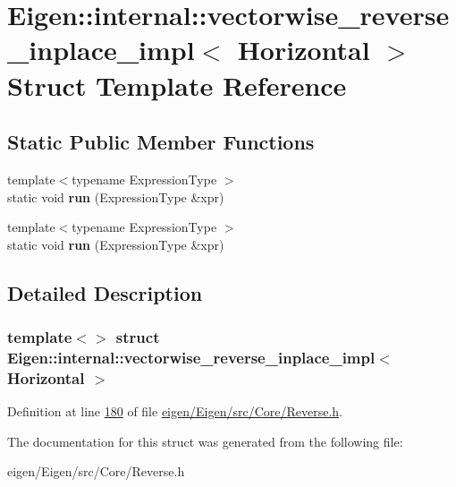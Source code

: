 \hypertarget{struct_eigen_1_1internal_1_1vectorwise__reverse__inplace__impl_3_01_horizontal_01_4}{}\section{Eigen\+:\+:internal\+:\+:vectorwise\+\_\+reverse\+\_\+inplace\+\_\+impl$<$ Horizontal $>$ Struct Template Reference}
\label{struct_eigen_1_1internal_1_1vectorwise__reverse__inplace__impl_3_01_horizontal_01_4}
\subsection*{Static Public Member Functions}
\begin{DoxyCompactItemize}
\item 
\mbox{\label{struct_eigen_1_1internal_1_1vectorwise__reverse__inplace__impl_3_01_horizontal_01_4_af29b95ed902a8adad594cd29f7dde0f9}} 
{\footnotesize template$<$typename Expression\+Type $>$ }\\static void {\bfseries run} (Expression\+Type \&xpr)
\item 
\mbox{\label{struct_eigen_1_1internal_1_1vectorwise__reverse__inplace__impl_3_01_horizontal_01_4_af29b95ed902a8adad594cd29f7dde0f9}} 
{\footnotesize template$<$typename Expression\+Type $>$ }\\static void {\bfseries run} (Expression\+Type \&xpr)
\end{DoxyCompactItemize}


\subsection{Detailed Description}
\subsubsection*{template$<$$>$\newline
struct Eigen\+::internal\+::vectorwise\+\_\+reverse\+\_\+inplace\+\_\+impl$<$ Horizontal $>$}



Definition at line \hyperlink{eigen_2_eigen_2src_2_core_2_reverse_8h_source_l00180}{180} of file \hyperlink{eigen_2_eigen_2src_2_core_2_reverse_8h_source}{eigen/\+Eigen/src/\+Core/\+Reverse.\+h}.



The documentation for this struct was generated from the following file\+:\begin{DoxyCompactItemize}
\item 
eigen/\+Eigen/src/\+Core/\+Reverse.\+h\end{DoxyCompactItemize}
